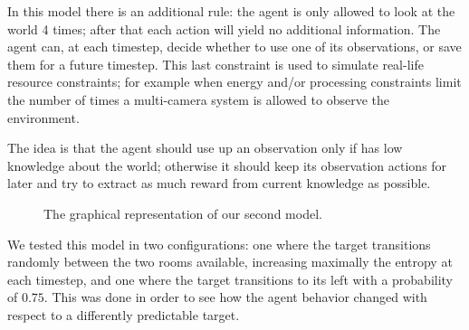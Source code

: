 In this model there is an additional rule: the agent is only allowed to look at the world 4 times;
after that each action will yield no additional information. The agent can, at each timestep, decide
whether to use one of its observations, or save them for a future timestep. This last constraint is
used to simulate real-life resource constraints; for example when energy and/or processing
constraints limit the number of times a multi-camera system is allowed to observe the environment.

The idea is that the agent should use up an observation only if has low knowledge about the world;
otherwise it should keep its observation actions for later and try to extract as much reward from
current knowledge as possible.

\begin{figure}[ht!]
\centering
{}
\caption{The graphical representation of our second model.}
\label{ref:finbudget1}
\end{figure}

We tested this model in two configurations: one where the target transitions randomly between the
two rooms available, increasing maximally the entropy at each timestep, and one where the target
transitions to its left with a probability of $0.75$. This was done in order to see how the agent behavior
changed with respect to a differently predictable target.

